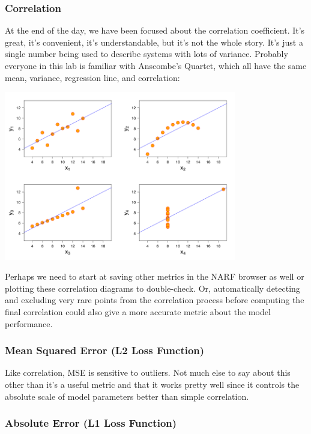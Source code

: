 \documentclass[11pt]{article}
\begin{document}
\subsubsection{Correlation}
\label{sec-2.7.1}


    At the end of the day, we have been focused about the correlation coefficient. It's great, it's convenient, it's understandable, but it's not the whole story. It's just a single number being used to describe systems with lots of variance. Probably everyone in this lab is familiar with Anscombe's Quartet, which all have the same mean, variance, regression line, and correlation:

    \begin{center}\includegraphics[width=4in]{anscombes_quartet.png}\end{center}

    Perhaps we need to start at saving other metrics in the NARF browser as well or plotting these correlation diagrams to double-check. Or, automatically detecting and excluding very rare points from the correlation process before computing the final correlation could also give a more accurate metric about the model performance.

\subsubsection{Mean Squared Error (L2 Loss Function)}
\label{sec-2.7.2}


    Like correlation, MSE is sensitive to outliers. Not much else to say about this other than it's a useful metric and that it works pretty well since it controls the absolute scale of model parameters better than simple correlation.

\subsubsection{Absolute Error (L1 Loss Function)}
\label{sec-2.7.3}
\end{document}
